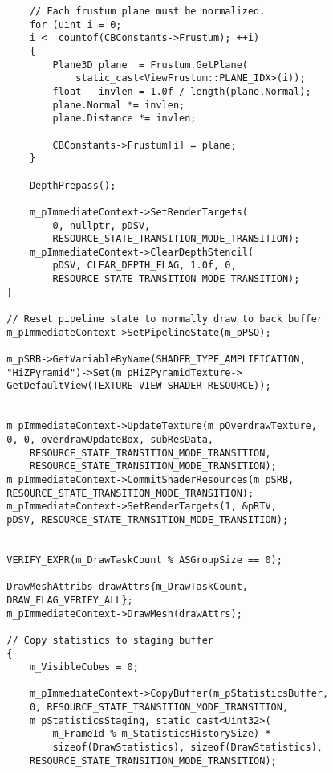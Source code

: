 \begin{lstlisting}
            // Each frustum plane must be normalized.
            for (uint i = 0; 
            i < _countof(CBConstants->Frustum); ++i)
            {
                Plane3D plane  = Frustum.GetPlane(
                    static_cast<ViewFrustum::PLANE_IDX>(i));
                float   invlen = 1.0f / length(plane.Normal);
                plane.Normal *= invlen;
                plane.Distance *= invlen;
    
                CBConstants->Frustum[i] = plane;
            }

            DepthPrepass();

            m_pImmediateContext->SetRenderTargets(
                0, nullptr, pDSV, 
                RESOURCE_STATE_TRANSITION_MODE_TRANSITION);
            m_pImmediateContext->ClearDepthStencil(
                pDSV, CLEAR_DEPTH_FLAG, 1.0f, 0, 
                RESOURCE_STATE_TRANSITION_MODE_TRANSITION);
        }        

        // Reset pipeline state to normally draw to back buffer
        m_pImmediateContext->SetPipelineState(m_pPSO);

        m_pSRB->GetVariableByName(SHADER_TYPE_AMPLIFICATION, 
        "HiZPyramid")->Set(m_pHiZPyramidTexture->
        GetDefaultView(TEXTURE_VIEW_SHADER_RESOURCE));
        
        
        m_pImmediateContext->UpdateTexture(m_pOverdrawTexture, 
        0, 0, overdrawUpdateBox, subResData, 
            RESOURCE_STATE_TRANSITION_MODE_TRANSITION, 
            RESOURCE_STATE_TRANSITION_MODE_TRANSITION);
        m_pImmediateContext->CommitShaderResources(m_pSRB, 
        RESOURCE_STATE_TRANSITION_MODE_TRANSITION);
        m_pImmediateContext->SetRenderTargets(1, &pRTV, 
        pDSV, RESOURCE_STATE_TRANSITION_MODE_TRANSITION);


        VERIFY_EXPR(m_DrawTaskCount % ASGroupSize == 0);
    
        DrawMeshAttribs drawAttrs{m_DrawTaskCount, 
        DRAW_FLAG_VERIFY_ALL};
        m_pImmediateContext->DrawMesh(drawAttrs);
    
        // Copy statistics to staging buffer
        {
            m_VisibleCubes = 0;
    
            m_pImmediateContext->CopyBuffer(m_pStatisticsBuffer, 
            0, RESOURCE_STATE_TRANSITION_MODE_TRANSITION,
            m_pStatisticsStaging, static_cast<Uint32>(
                m_FrameId % m_StatisticsHistorySize) * 
                sizeof(DrawStatistics), sizeof(DrawStatistics),
            RESOURCE_STATE_TRANSITION_MODE_TRANSITION);
    

\end{lstlisting}
